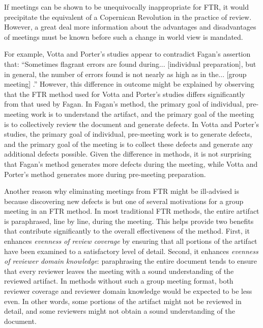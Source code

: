 If meetings can be shown to be unequivocally inappropriate for FTR, it
would precipitate the equivalent of a Copernican Revolution in the practice
of review.  However, a great deal more information about the advantages and
disadvantages of meetings must be known before such a change in world view
is mandated.

For example, Votta and Porter's studies appear to contradict Fagan's
assertion that: ``Sometimes flagrant errors are found during... [individual
preparation], but in general, the number of errors found is not nearly as
high as in the... [group meeting] \cite{Fagan76}.''  However, this
difference in outcome might be explained by observing that the FTR method
used for Votta and Porter's studies differs significantly from that used by
Fagan.  In Fagan's method, the primary goal of individual, pre-meeting work
is to understand the artifact, and the primary goal of the meeting is to
collectively review the document and generate defects.  In Votta and
Porter's studies, the primary goal of individual, pre-meeting work is to
generate defects, and the primary goal of the meeting is to collect these
defects and generate any additional defects possible. Given the difference
in methods, it is not surprising that Fagan's method generates more defects
during the meeting, while Votta and Porter's method generates more during
pre-meeting preparation.

Another reason why eliminating meetings from FTR might be ill-advised is
because discovering new defects is but one of several motivations for a
group meeting in an FTR method.  In most traditional FTR methods, the
entire artifact is paraphrased, line by line, during the meeting. This
helps provide two benefits that contribute significantly to the overall
effectiveness of the method.  First, it enhances {\em evenness of review
coverage} by ensuring that all portions of the artifact have been examined
to a satisfactory level of detail.  Second, it enhances {\em evenness of
reviewer domain knowledge}: paraphrasing the entire document tends to
ensure that every reviewer leaves the meeting with a sound understanding of
the reviewed artifact.  In methods without such a group meeting format,
both reviewer coverage and reviewer domain knowledge would be expected to
be less even. In other words, some portions of the artifact might not be
reviewed in detail, and some reviewers might not obtain a sound
understanding of the document.

